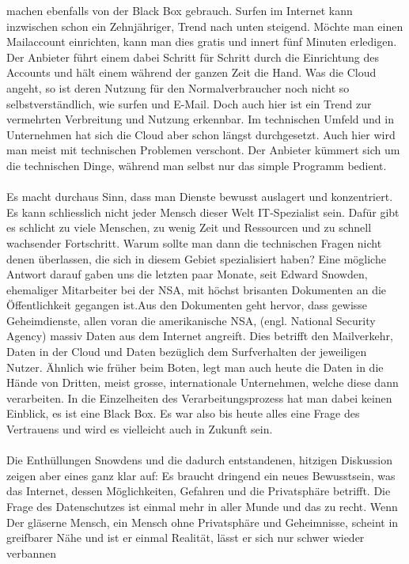 machen ebenfalls von der Black Box gebrauch. Surfen im Internet kann inzwischen schon ein Zehnjähriger, Trend nach unten steigend. Möchte man einen Mailaccount einrichten, kann man dies gratis und innert fünf Minuten erledigen. Der Anbieter führt einem dabei Schritt für Schritt durch die Einrichtung des Accounts und hält einem während der ganzen Zeit die Hand. Was die Cloud angeht, so ist deren Nutzung für den Normalverbraucher noch nicht so selbstverständlich, wie surfen und E-Mail. Doch auch hier ist ein Trend zur vermehrten Verbreitung und Nutzung erkennbar. Im technischen Umfeld und in Unternehmen hat sich die Cloud aber schon längst durchgesetzt. Auch hier wird man meist mit technischen Problemen verschont. Der Anbieter kümmert sich um die technischen Dinge, während man selbst nur das simple Programm bedient.
\\
\\
Es macht durchaus Sinn, dass man Dienste bewusst auslagert und konzentriert. Es kann schliesslich nicht jeder Mensch dieser Welt IT-Spezialist sein. Dafür gibt es schlicht zu viele Menschen, zu wenig Zeit und Ressourcen und zu schnell wachsender Fortschritt. Warum sollte man dann die technischen Fragen nicht denen überlassen, die sich in diesem Gebiet spezialisiert haben? Eine mögliche Antwort darauf gaben uns die letzten paar Monate, seit Edward Snowden, ehemaliger Mitarbeiter bei der NSA, mit höchst brisanten Dokumenten an die Öffentlichkeit gegangen ist.Aus den Dokumenten geht hervor, dass gewisse Geheimdienste, allen voran die amerikanische NSA, (engl. National Security Agency) massiv Daten aus dem Internet angreift. Dies betrifft den Mailverkehr, Daten in der Cloud und Daten bezüglich dem Surfverhalten der jeweiligen Nutzer. Ähnlich wie früher beim Boten, legt man auch heute die Daten in die Hände von Dritten, meist grosse, internationale Unternehmen, welche diese dann verarbeiten. In die Einzelheiten des Verarbeitungsprozess hat man dabei keinen Einblick, es ist eine Black Box. Es war also bis heute alles eine Frage des Vertrauens und wird es vielleicht auch in Zukunft sein.
\\
\\
Die Enthüllungen Snowdens und die dadurch entstandenen, hitzigen Diskussion zeigen aber eines ganz klar auf: Es braucht dringend ein neues Bewusstsein, was das Internet, dessen Möglichkeiten,  Gefahren und die Privatsphäre betrifft. Die Frage des Datenschutzes ist einmal mehr in aller Munde und das zu recht. Wenn  Der gläserne Mensch, ein Mensch ohne Privatsphäre und Geheimnisse, scheint in greifbarer Nähe und ist er einmal Realität, lässt er sich nur schwer wieder verbannen
